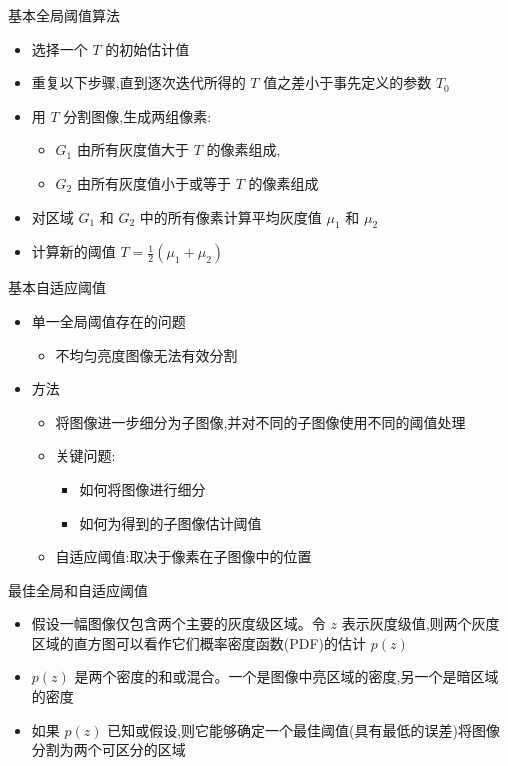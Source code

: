 \documentclass[presentation]{beamer}
\begin{document}
\begin{frame}[label={sec:org33778fb}]{基本全局阈值算法}
\begin{itemize}
\item 选择一个 \(T\) 的初始估计值
\item 重复以下步骤,直到逐次迭代所得的 \(T\) 值之差小于事先定义的参数 \(T_0\)
\item 用 \(T\) 分割图像,生成两组像素:
\begin{itemize}
\item \(G_1\) 由所有灰度值大于 \(T\) 的像素组成,
\item \(G_2\) 由所有灰度值小于或等于 \(T\) 的像素组成
\end{itemize}
\item 对区域 \(G_1\) 和 \(G_2\) 中的所有像素计算平均灰度值 \(μ_1\) 和 \(μ_2\)
\item 计算新的阈值 \(T=\frac{1}{2}(\mu_1+\mu_2)\)
\end{itemize}
\end{frame}

\begin{frame}[label={sec:org63c5734}]{基本自适应阈值}
\begin{itemize}
\item 单一全局阈值存在的问题
\begin{itemize}
\item 不均匀亮度图像无法有效分割
\end{itemize}
\item 方法
\begin{itemize}
\item 将图像进一步细分为子图像,并对不同的子图像使用不同的阈值处理
\item 关键问题:
\begin{itemize}
\item 如何将图像进行细分
\item 如何为得到的子图像估计阈值
\end{itemize}
\item 自适应阈值:取决于像素在子图像中的位置
\end{itemize}
\end{itemize}
\end{frame}

\begin{frame}[label={sec:orgfbd2357}]{最佳全局和自适应阈值}
\begin{itemize}
\item 假设一幅图像仅包含两个主要的灰度级区域。令 \(z\) 表示灰度级值,则两个灰度区域的直方图可以看作它们概率密度函数(PDF)的估计 \(p(z)\)
\item \(p(z)\) 是两个密度的和或混合。一个是图像中亮区域的密度,另一个是暗区域的密度
\item 如果 \(p(z)\) 已知或假设,则它能够确定一个最佳阈值(具有最低的误差)将图像分割为两个可区分的区域
\end{itemize}
\end{frame}
\end{document}
